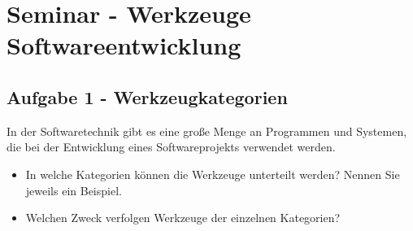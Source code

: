 	
\section{Seminar - Werkzeuge Softwareentwicklung}

    \subsection{Aufgabe 1 - Werkzeugkategorien}
	
	   \begin{aufgabe}
           In der Softwaretechnik gibt es eine große Menge an Programmen und Systemen, die bei der Entwicklung eines Softwareprojekts verwendet werden.
           \\[-.7cm]\begin{itemize}
               \setlength\itemsep{0.1px}
               \item In welche Kategorien können die Werkzeuge unterteilt werden? Nennen Sie jeweils
               ein Beispiel.
               \item Welchen Zweck verfolgen Werkzeuge der einzelnen Kategorien?
           \end{itemize}
       \end{aufgabe}
   
